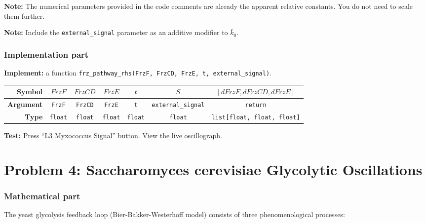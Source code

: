 \documentclass[11pt]{article}
\begin{document}
\textbf{Note:} The numerical parameters provided in the code comments are already the apparent relative constants. You do not need to scale them further.

\textbf{Note:} Include the \lstinline|external_signal| parameter as an additive modifier to $\bar{k}_0$.

\subsubsection*{Implementation part}
\textbf{Implement:} a function \lstinline|frz_pathway_rhs(FrzF, FrzCD, FrzE, t, external_signal)|.

\begin{center}
\renewcommand{\arraystretch}{2.0}
\begin{tabular}{r | c | c | c | c | c | c}
\toprule
\textbf{Symbol} & $FrzF$ & $FrzCD$ & $FrzE$ & $t$ & $S$ & $[dFrzF, dFrzCD, dFrzE]$ \\ \midrule
\textbf{Argument} & \lstinline|FrzF| & \lstinline|FrzCD| & \lstinline|FrzE| & \lstinline|t| & \lstinline|external_signal| & \lstinline|return| \\ \midrule
\textbf{Type} & \lstinline|float| & \lstinline|float| & \lstinline|float| & \lstinline|float| & \lstinline|float| & \lstinline|list[float, float, float]| \\
\bottomrule
\end{tabular}
\end{center}

\textbf{Test:} Press ``L3 Myxococcus Signal'' button. View the live oscillograph.

\section*{Problem 4: Saccharomyces cerevisiae Glycolytic Oscillations}

\subsubsection*{Mathematical part}
The yeast glycolysis feedback loop (Bier-Bakker-Westerhoff model) consists of three phenomenological processes:
\end{document}
